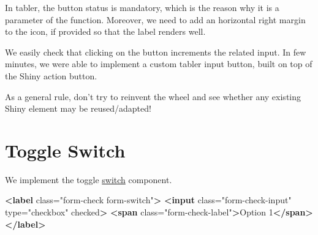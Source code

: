 \documentclass[]{book}
\newenvironment{Shaded}{\begin{snugshade}}{\end{snugshade}}
\newcommand{\ControlFlowTok}[1]{\textcolor[rgb]{0.13,0.29,0.53}{\textbf{#1}}}
\newcommand{\DataTypeTok}[1]{\textcolor[rgb]{0.13,0.29,0.53}{#1}}
\newcommand{\KeywordTok}[1]{\textcolor[rgb]{0.13,0.29,0.53}{\textbf{#1}}}
\newcommand{\NormalTok}[1]{#1}
\newcommand{\OperatorTok}[1]{\textcolor[rgb]{0.81,0.36,0.00}{\textbf{#1}}}
\newcommand{\OtherTok}[1]{\textcolor[rgb]{0.56,0.35,0.01}{#1}}
\newcommand{\StringTok}[1]{\textcolor[rgb]{0.31,0.60,0.02}{#1}}
\begin{document}
In tabler, the button status is mandatory, which is the reason why it is a parameter of the function. Moreover, we need to add an horizontal right margin to the icon, if provided so that the label renders well.

\begin{Shaded}
\end{Shaded}

We easily check that clicking on the button increments the related input. In few minutes, we were able to implement a custom tabler input button, built on top of the Shiny action button.

As a general rule, don't try to reinvent the wheel and see whether any existing Shiny element may be reused/adapted!

\hypertarget{toggle-switch}{%
\section{Toggle Switch}\label{toggle-switch}}

We implement the toggle \href{https://preview-dev.tabler.io/docs/form-elements.html\#custom-selectboxes}{switch} component.

\begin{Shaded}
\begin{Highlighting}[]
\KeywordTok{<label}\OtherTok{ class=}\StringTok{"form-check form-switch"}\KeywordTok{>}
\KeywordTok{<input}\OtherTok{ class=}\StringTok{"form-check-input"}\OtherTok{ type=}\StringTok{"checkbox"}\OtherTok{ checked}\KeywordTok{>}
\KeywordTok{<span}\OtherTok{ class=}\StringTok{"form-check-label"}\KeywordTok{>}\NormalTok{Option 1}\KeywordTok{</span>}
\KeywordTok{</label>}
\end{Highlighting}
\end{Shaded}
\end{document}
